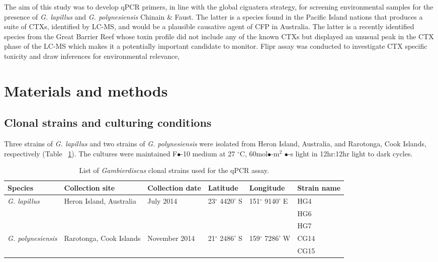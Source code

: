 \documentclass[12pt]{article}
\begin{document}
The aim of this study was to develop qPCR primers, in line with the global ciguatera strategy, for screening environmental samples for the presence of \emph{G. lapillus} and \emph{G. polynesiensis} Chinain \& Faust. The latter is a species found in the Pacific Island nations that produces a suite of CTXs, identified by LC-MS, and would be a plausible causative agent of CFP in Australia. The latter is a recently identified species from the Great Barrier Reef whose toxin profile did not include any of the known CTXs but displayed an unusual peak in the CTX phase of the LC-MS which makes it a potentially important candidate to monitor. Flipr assay was conducted to investigate CTX specific toxicity and draw inferences for environmental relevance,

\newpage
\section{Materials and methods}
\subsection{Clonal strains and culturing conditions}
Three strains of \emph{G. lapillus} and two strains of \emph{G. polynesiensis} were isolated from Heron Island, Australia, and Rarotonga, Cook Islands, respectively (Table ~\ref{tbl:StrainTable}). The cultures were maintained F$\bullet$-10 medium at 27 $^{\circ}$C, 60mol$\bullet$-m$^{2}$ $\bullet$-s light in 12hr:12hr light to dark cycles.
\FloatBarrier
\begin{table}
\caption{List of \emph{Gambierdiscus} clonal strains used for the qPCR assay.}
\label{tbl:StrainTable}
\begin{tabular}{  | p{2cm} | p{2cm} | p{2cm}| p{3cm} | p{3cm} | p{2cm} | }
\hline
\textbf{Species}  & \textbf{Collection site} &  \textbf{Collection date} &\textbf{Latitude} & \textbf{Longitude} & \textbf{Strain name} \\
  \hline
   \emph{G. lapillus}   &Heron Island, Australia &July 2014 &23$^{\circ}$ 4420' S&151$^{\circ}$ 9140' E  & HG4 \\
   \hline
&&&&& HG6\\
 \hline
 &&&& &HG7\\
 \hline
\emph{G. polynesiensis}&Rarotonga, Cook Islands&November 2014 &21$^{\circ}$ 2486' S&159$^{\circ}$ 7286' W  & CG14 \\
 \hline
&&&&&CG15\\
    \hline
 \end{tabular}
\end{table}
\end{document}
